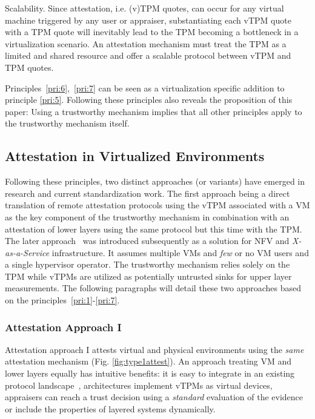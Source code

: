 \begin{prince}\label{pri:7} Scalability. Since attestation, i.e. (v)TPM quotes, can occur for any virtual machine triggered by any user or appraiser, substantiating each vTPM quote with a TPM quote will inevitably lead to the TPM becoming a bottleneck in a virtualization scenario. An attestation mechanism must treat the TPM as a limited and shared resource and offer a scalable protocol between vTPM and TPM quotes.  
\end{prince}

Principles~\ref{pri:6},~\ref{pri:7} can be seen as a virtualization specific addition to principle \ref{pri:5}. Following these principles also reveals the proposition of this paper: Using a trustworthy mechanism implies that all other principles apply to the trustworthy mechanism itself.

\subsection{Attestation in Virtualized Environments}

Following these principles, two distinct approaches (or variants) have emerged in research and current standardization work. The first approach being a direct translation of remote attestation protocols using the vTPM associated with a VM as the key component of the trustworthy mechanism in combination with an attestation of lower layers using the same protocol but this time with the TPM. The later approach~\cite{lauer2016} was introduced subsequently as a solution for NFV and \emph{X-as-a-Service} infrastructure. It assumes multiple VMs and \emph{few} or no VM users and a single hypervisor operator. The trustworthy mechanism relies solely on the TPM while vTPMs are utilized as potentially untrusted sinks for upper layer measurements. The following paragraphs will detail these two approaches based on the principles~\ref{pri:1}-\ref{pri:7}.  

\subsubsection{Attestation Approach I}

Attestation approach I attests virtual and physical environments using the \emph{same} attestation mechanism (Fig. \ref{fig:type1attest}). An approach treating VM and lower layers equally has intuitive benefits: it is easy to integrate in an existing protocol landscape~\cite{DAA,ISOTPM}, architectures implement vTPMs as virtual devices\cite{vtpm,lauer2016}, appraisers can reach a trust decision using a \emph{standard} evaluation of the evidence or include the properties of layered systems dynamically.

